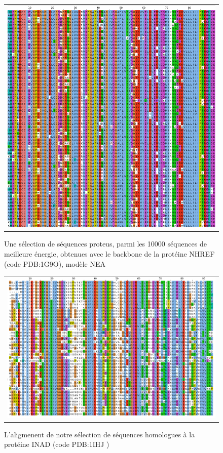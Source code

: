    \begin{figure}[t]
     \centering
     \begin{tabular}{c}
       \includegraphics[width=17cm]{proteus/1G9O.png} \\
     \end{tabular}
       \caption{Une sélection de séquences proteus, parmi les 10000 séquences de meilleure énergie, obtenues avec le backbone de la protéine NHREF (code PDB:1G9O), modèle NEA}
\label{align_proteus:NHREF}
   \end{figure}

\clearpage

   \begin{figure}[t]
     \centering
     \begin{tabular}{c}
       \includegraphics[width=17cm]{homologues/1IHJ.png} \\
     \end{tabular}
     \caption{L'aligmenent de notre sélection de séquences homologues à la protéine INAD (code PDB:1IHJ )}
\label{align_homo:INAD}
   \end{figure}

